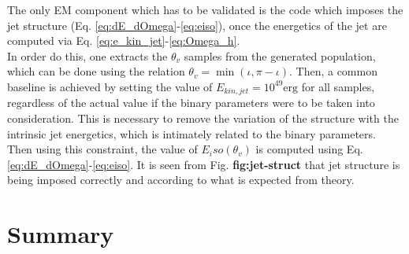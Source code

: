     The only EM component which has to be validated is the code which imposes the jet
    structure (Eq. \ref{eq:dE_dOmega}-\ref{eq:eiso}), once the energetics of the jet are
    computed via Eq. \ref{eq:e_kin_jet}-\ref{eq:Omega_h}.\\
    In order do this, one extracts the $\theta_v$ samples from the generated population,
    which can be done using the relation $\theta_v = \min(\iota, \pi - \iota)$. Then, a
    common baseline is achieved by setting the value of $E_{kin, jet} = 10^{49} \text{
    erg}$ for all samples, regardless of the actual value if the binary parameters were
    to be taken into consideration. This is necessary to remove the variation of the
    structure with the intrinsic jet energetics, which is intimately related to the
    binary parameters.\\
    Then using this constraint, the value of $E_iso(\theta_v)$ is computed using Eq.
    \ref{eq:dE_dOmega}-\ref{eq:eiso}. It is seen from Fig. \textbf{fig:jet-struct} that
    jet structure is being imposed correctly and according to what is expected from
    theory.

\section{Summary}
